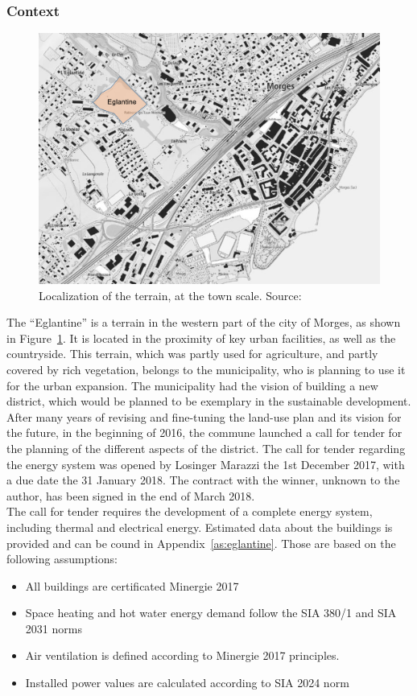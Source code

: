 \documentclass{article}
\begin{document}
\subsubsection{Context}

\begin{figure}[htp]
\centering
\includegraphics[width=1\textwidth]{morges.png}
\caption{Localization of the terrain, at the town scale. Source:~\cite{GuichetCartographiqueEtat}}
\label{fig:morges}
\end{figure}

The “Eglantine” is a terrain in the western part of the city of Morges, as shown in Figure~\ref{fig:morges}. It is located in the proximity of key urban facilities, as well as the countryside. This terrain, which was partly used for agriculture, and partly covered by rich vegetation, belongs to the municipality, who is planning to use it for the urban expansion. The municipality had the vision of building a new district, which would be planned to be exemplary in the sustainable development. After many years of revising and fine-tuning the land-use plan and its vision for the future, in the beginning of 2016, the commune launched a call for tender for the planning of the different aspects of the district. The call for tender regarding the energy system was opened by Losinger Marazzi the 1st December 2017, with a due date the 31 January 2018. The contract with the winner, unknown to the author, has been signed in the end of March 2018. \\

The call for tender requires the development of a complete energy system, including thermal and electrical energy. Estimated data about the buildings is provided and can be cound in Appendix~\ref{as:eglantine}. Those are based on the following assumptions:
\begin{itemize}
    \item All buildings are certificated Minergie 2017
    \item Space heating and hot water energy demand follow the SIA 380/1 and SIA 2031 norms
    \item Air ventilation is defined according to Minergie 2017 principles.
    \item Installed power values are calculated according to SIA 2024 norm
\end{itemize}
\end{document}
